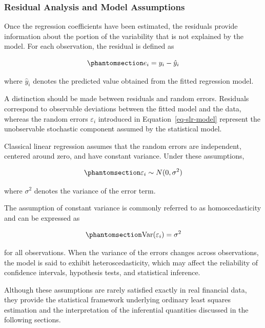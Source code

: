 \documentclass[
  12pt,
  letterpaper,
]{book}
\begin{document}
\subsubsection{Residual Analysis and Model
Assumptions}\label{residual-analysis-and-model-assumptions}

Once the regression coefficients have been estimated, the residuals
provide information about the portion of the variability that is not
explained by the model. For each observation, the residual is defined as

\begin{equation}\phantomsection\label{eq-residuals}{
e_i
=
y_i - \hat{y}_i
}\end{equation}

where \(\hat{y}_i\) denotes the predicted value obtained from the fitted
regression model.

A distinction should be made between residuals and random errors.
Residuals correspond to observable deviations between the fitted model
and the data, whereas the random errors \(\varepsilon_i\) introduced in
Equation~\ref{eq-slr-model} represent the unobservable stochastic
component assumed by the statistical model.

Classical linear regression assumes that the random errors are
independent, centered around zero, and have constant variance. Under
these assumptions,

\begin{equation}\phantomsection\label{eq-gaussian-errors}{
\varepsilon_i
\sim
N(0,\sigma^2)
}\end{equation}

where \(\sigma^2\) denotes the variance of the error term.

The assumption of constant variance is commonly referred to as
homoscedasticity and can be expressed as

\begin{equation}\phantomsection\label{eq-homoscedasticity}{
\mathrm{Var}(\varepsilon_i)
=
\sigma^2
}\end{equation}

for all observations. When the variance of the errors changes across
observations, the model is said to exhibit heteroscedasticity, which may
affect the reliability of confidence intervals, hypothesis tests, and
statistical inference.

Although these assumptions are rarely satisfied exactly in real
financial data, they provide the statistical framework underlying
ordinary least squares estimation and the interpretation of the
inferential quantities discussed in the following sections.
\end{document}
